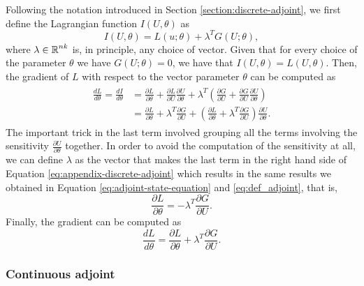 Following the notation introduced in Section \ref{section:discrete-adjoint}, we first define the Lagrangian function $I(U, \theta)$ as 
\begin{equation}
    I(U, \theta) = L(u; \theta) + \lambda^T G(U; \theta),
\end{equation}
where $\lambda \in \operatorname{\mathbb{R}}^{nk}$ is, in principle, any choice of vector. 
Given that for every choice of the parameter $\theta$ we have $G(U; \theta) = 0$, we have that $I(U, \theta) = L(U, \theta)$.
Then, the gradient of $L$ with respect to the vector parameter $\theta$ can be computed as 
\begin{align}
\begin{split}
    \frac{dL}{d\theta}
    = 
    \frac{dI}{d\theta}
    &= 
    \frac{\partial L}{\partial \theta} + \frac{\partial L}{\partial U} \frac{\partial U}{\partial \theta}
    + 
    \lambda^T
    \left( \frac{\partial G}{\partial U} + \frac{\partial G}{\partial U} \frac{\partial U}{\partial \theta} \right) \nonumber
    \\ 
    &= 
    \frac{\partial L}{\partial \theta} + \lambda^T \frac{\partial G}{\partial U} 
    + 
    \left( \frac{\partial L}{\partial \theta} + \lambda^T \frac{\partial G}{\partial U} \right) \frac{\partial U}{\partial \theta}.
\end{split}
\label{eq:appendix-discrete-adjoint}
\end{align}
The important trick in the last term involved grouping all the terms involving the sensitivity $\frac{\partial U}{\partial \theta}$ together. 
In order to avoid the computation of the sensitivity at all, we can define $\lambda$ as the vector that makes the last term in the right hand side of Equation \eqref{eq:appendix-discrete-adjoint} which results in the same results we obtained in Equation \eqref{eq:adjoint-state-equation} and \eqref{eq:def_adjoint}, that is, 
\begin{equation}
    \frac{\partial L}{\partial \theta} = - \lambda^T \frac{\partial G}{\partial U}.
\end{equation}
Finally, the gradient can be computed as 
\begin{equation}
    \frac{dL}{d\theta} 
    = 
    \frac{\partial L}{\partial \theta} + \lambda^T \frac{\partial G}{\partial U} .
\end{equation}

\subsubsection{Continuous adjoint}

